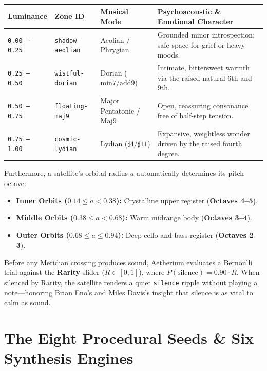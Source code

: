 \documentclass[11pt,oneside,openany]{book}
\begin{document}
\begin{center}
\footnotesize
\begin{tabularx}{\textwidth}{l l l X}
\toprule
\textbf{Luminance} & \textbf{Zone ID} & \textbf{Musical Mode} & \textbf{Psychoacoustic \& Emotional Character} \\
\midrule
\texttt{0.00 -- 0.25} & \texttt{shadow-aeolian} & Aeolian / Phrygian & Grounded minor introspection; safe space for grief or heavy moods. \\
\texttt{0.25 -- 0.50} & \texttt{wistful-dorian} & Dorian ($\text{min7}/\text{add9}$) & Intimate, bittersweet warmth via the raised natural 6th and 9th. \\
\texttt{0.50 -- 0.75} & \texttt{floating-maj9} & Major Pentatonic / $\text{Maj9}$ & Open, reassuring consonance free of half-step tension. \\
\texttt{0.75 -- 1.00} & \texttt{cosmic-lydian} & Lydian ($\sharp 4 / \sharp 11$) & Expansive, weightless wonder driven by the raised fourth degree. \\
\bottomrule
\end{tabularx}
\end{center}

Furthermore, a satellite's orbital radius $a$ automatically determines its pitch octave:
\begin{itemize}
  \item \textbf{Inner Orbits ($0.14 \le a < 0.38$):} Crystalline upper register (\textbf{Octaves 4--5}).
  \item \textbf{Middle Orbits ($0.38 \le a < 0.68$):} Warm midrange body (\textbf{Octaves 3--4}).
  \item \textbf{Outer Orbits ($0.68 \le a \le 0.94$):} Deep cello and bass register (\textbf{Octaves 2--3}).
\end{itemize}

Before any Meridian crossing produces sound, Aetherium evaluates a Bernoulli trial against the \textbf{Rarity} slider ($R \in [0, 1]$), where $P(\text{silence}) = 0.90 \cdot R$. When silenced by Rarity, the satellite renders a quiet \texttt{silence} ripple without playing a note---honoring Brian Eno's and Miles Davis's insight that silence is as vital to calm as sound.

\section{The Eight Procedural Seeds \& Six Synthesis Engines}
\end{document}
